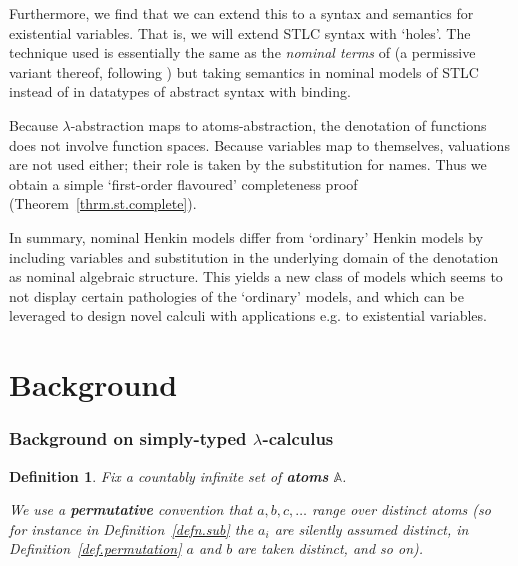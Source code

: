 \documentclass[submission,copyright]{eptcs}
\newtheorem{defn}[thrm]{Definition}
\newcommand{\deffont}[1]{\textbf{#1}}
\begin{document}
Furthermore, we find that we can extend this to a syntax and semantics for existential variables. 
That is, we will extend STLC syntax with `holes'. 
The technique used is essentially the same as the \emph{nominal terms} of \cite{gabbay:nomu-jv} (a permissive variant thereof, following \cite{gabbay:perntu,gabbay:perntu-jv}) but taking semantics in nominal models of STLC instead of in datatypes of abstract syntax with binding.


 



Because $\lambda$-abstraction maps to atoms-abstraction, the denotation of functions does not involve function spaces. 
Because variables map to themselves, valuations are not used either; their role is taken by the substitution for names.
Thus we obtain a simple `first-order flavoured' completeness proof (Theorem~\ref{thrm.st.complete}).

In summary, nominal Henkin models differ from `ordinary' Henkin models by including variables and substitution in the underlying domain of the denotation as nominal algebraic structure.
This yields a new class of models which seems to not display certain pathologies of the `ordinary' models, and which can be leveraged to design novel calculi with applications e.g. to existential variables.
 



\section{Background}

\subsubsection*{Background on simply-typed $\lambda$-calculus}

\begin{defn}
\label{defn.atoms}
Fix a countably infinite set of \deffont{atoms} $\mathbb A$.

We use a \deffont{permutative} convention that $a,b,c,\ldots$ range over \emph{distinct} atoms (so for instance in Definition~\ref{defn.sub} the $a_i$ are silently assumed distinct, in Definition~\ref{def.permutation} $a$ and $b$ are taken distinct, and so on).
\end{defn}
\end{document}
